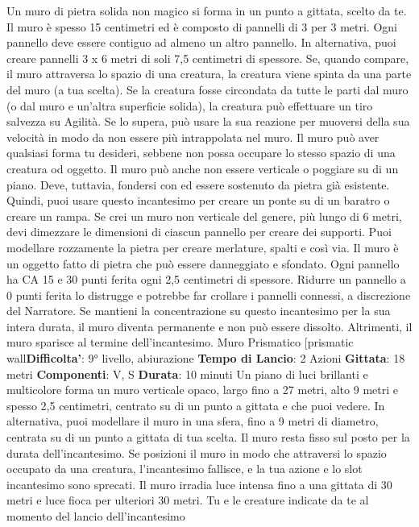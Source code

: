\begin{multicols}{2}
Un muro di pietra solida non magico si forma in un
punto a gittata, scelto da te. Il muro è spesso 15
centimetri ed è composto di pannelli di 3 per 3 metri.
Ogni pannello deve essere contiguo ad almeno un altro
pannello. In alternativa, puoi creare pannelli 3 x 6 metri
di soli 7,5 centimetri di spessore.
Se, quando compare, il muro attraversa lo spazio di una
creatura, la creatura viene spinta da una parte del muro
(a tua scelta). Se la creatura fosse circondata da tutte le
parti dal muro (o dal muro e un’altra superficie solida),
la creatura può effettuare un tiro salvezza su Agilità.
Se lo supera, può usare la sua reazione per muoversi
della sua velocità in modo da non essere più
intrappolata nel muro.
Il muro può aver qualsiasi forma tu desideri, sebbene
non possa occupare lo stesso spazio di una creatura od
oggetto. Il muro può anche non essere verticale o
poggiare su di un piano. Deve, tuttavia, fondersi con ed
essere sostenuto da pietra già esistente. Quindi, puoi
usare questo incantesimo per creare un ponte su di un
baratro o creare un rampa.
Se crei un muro non verticale del genere, più lungo di 6
metri, devi dimezzare le dimensioni di ciascun pannello
per creare dei supporti. Puoi modellare rozzamente la
pietra per creare merlature, spalti e così via.
Il muro è un oggetto fatto di pietra che può essere
danneggiato e sfondato. Ogni pannello ha CA 15 e 30
punti ferita ogni 2,5 centimetri di spessore. Ridurre un
pannello a 0 punti ferita lo distrugge e potrebbe far
crollare i pannelli connessi, a discrezione del Narratore.
Se mantieni la concentrazione su questo incantesimo
per la sua intera durata, il muro diventa permanente e
non può essere dissolto. Altrimenti, il muro sparisce al
termine dell’incantesimo.
Muro Prismatico
[prismatic wall\textbf{Difficolta'}:
9° livello, abiurazione
\textbf{Tempo di Lancio}: 2 Azioni
\textbf{Gittata}: 18 metri
\textbf{Componenti}: V, S
\textbf{Durata}: 10 minuti
Un piano di luci brillanti e multicolore forma un muro
verticale opaco, largo fino a 27 metri, alto 9 metri e
spesso 2,5 centimetri, centrato su di un punto a gittata
e che puoi vedere. In alternativa, puoi modellare il muro
in una sfera, fino a 9 metri di diametro, centrata su di un
punto a gittata di tua scelta. Il muro resta fisso sul posto
per la durata dell’incantesimo. Se posizioni il muro in
modo che attraversi lo spazio occupato da una
creatura, l’incantesimo fallisce, e la tua azione e lo slot
incantesimo sono sprecati.
Il muro irradia luce intensa fino a una gittata di 30 metri
e luce fioca per ulteriori 30 metri. Tu e le creature
indicate da te al momento del lancio dell’incantesimo

\end{multicols}
